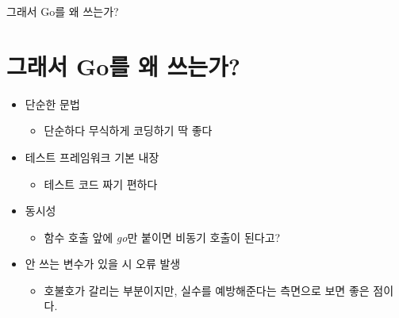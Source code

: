 \documentclass{beamer}
\begin{document}
 \begin{frame}{그래서 Go를 왜 쓰는가?}
 \section{그래서 Go를 왜 쓰는가?}
  \begin{itemize}
   \item 단순한 문법
   \begin{itemize}
    \item 단순하다 \textrightarrow 무식하게 코딩하기 딱 좋다
   \end{itemize}

   \item 테스트 프레임워크 기본 내장
   \begin{itemize}
    \item 테스트 코드 짜기 편하다
   \end{itemize}

   \item 동시성
   \begin{itemize}
    \item 함수 호출 앞에 \textit{go}만 붙이면 비동기 호출이 된다고?
   \end{itemize}

   \item 안 쓰는 변수가 있을 시 오류 발생
   \begin{itemize}
    \item 호불호가 갈리는 부분이지만, 실수를 예방해준다는 측면으로 보면 좋은 점이다.
   \end{itemize}

  \end{itemize}
 \end{frame}
\end{document}
